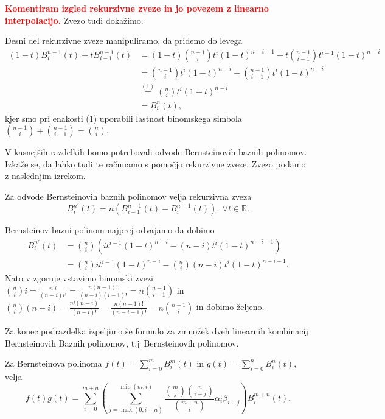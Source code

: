 \documentclass[isrm2, tisk]{fmfdelo}
\newcommand{\R}{\mathbb R}
\newcommand{\mycomment}[1]{\textbf{\textcolor{red}{#1}}}
\begin{document}
    \mycomment{Komentiram izgled rekurzivne zveze in jo povezem z linearno interpolacijo.}
    Zvezo tudi dokažimo.
    \begin{dokaz} Desni del rekurzivne zveze manipuliramo, da pridemo do levega
        \begin{align*}
            (1-t)B_i^{n-1}(t) + tB_{i-1}^{n-1}(t)  &= (1-t)\binom{n-1}{i}t^{i}(1-t)^{n-i-1} + t\binom{n-1}{i-1}t^{i-1}(1-t)^{n-i}  \\
            &= \binom{n-1}{i}t^{i}(1-t)^{n-i} + \binom{n-1}{i-1}t^{i}(1-t)^{n-i}  \\
            &\stackrel{(1)}{=} \binom{n}{i}t^{i}(1-t)^{n-i}  \\
            &= B_i^n(t),
        \end{align*}
        kjer smo pri enakosti (1) uporabili lastnost binomskega simbola $\binom{n-1}{i} + \binom{n-1}{i-1} = \binom{n}{i}.$
    \end{dokaz}
    V kasnejših razdelkih bomo potrebovali odvode Bernsteinovih baznih polinomov.
    Izkaže se, da lahko tudi te računamo s pomočjo rekurzivne zveze.
    Zvezo podamo z naslednjim izrekom.
    \begin{izrek}
        Za odvode Bernsteinovih baznih polinomov velja rekurzivna zveza
        \[B_{i}^{n\prime}(t)=n(B_{i-1}^{n-1}(t) - B_{i}^{n-1}(t)),\ \forall t\in\R.\]
    \end{izrek}
    \begin{dokaz} Bernsteinov bazni polinom najprej odvajamo da dobimo
       \begin{align*}
           B_{i}^{n\prime}(t) &=\binom{n}{i}\left(it^{i-1}(1-t)^{n-i} - (n-i) t^i(1-t)^{n-i-1} \right) \\
                              &=\binom{n}{i}it^{i-1}(1-t)^{n-i} - \binom{n}{i}(n-i) t^i(1-t)^{n-i-1}.
       \end{align*}
    Nato v zgornje vstavimo binomski zvezi $\binom{n}{i}i = \frac{n!i}{(n-i)i!} =  \frac{n(n-1)!}{(n-i)(i-1)!} = n\binom{n-1}{i-1}$ in $\binom{n}{i}(n-i) = \frac{n!(n-i)}{(n-i)!}  = \frac{n(n-1)!}{(n-i-1)!} =n\binom{n-1}{i}$ in dobimo željeno.
    \end{dokaz}
    Za konec podrazdelka izpeljimo še formulo za zmnožek dveh linearnih kombinacij Bernsteinovih Baznih polinomov, t.j\ Bernsteinovih polinomov.
    \begin{izrek}
        Za Bernsteinova polinoma $f(t)=\sum_{i=0}^{m}B_i^m(t)$ in $g(t)=\sum_{i=0}^{n}B_i^n(t)$, velja
        \[ f(t)g(t) = \sum_{i=0}^{m+n}\left(\sum_{j=\max(0,i-n)}^{\min(m,i)} \frac{\binom{m}{j}\binom{n}{i-j}}{\binom{m+n}{i}} \alpha_i\beta_{i-j} \right)B_{i}^{m+n}(t).\]
    \end{izrek}
\end{document}
